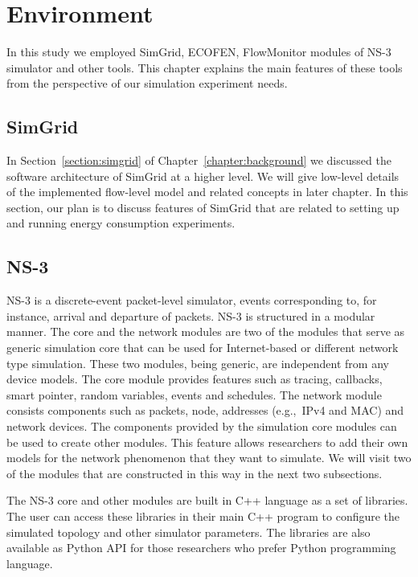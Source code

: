 \chapter{Environment}
\label{chapter:environment}
In this study we employed SimGrid, ECOFEN, FlowMonitor modules of NS-3 simulator and other tools. This chapter explains the main features of these tools from the perspective of our simulation experiment needs.

\section{SimGrid}
In Section~\ref{section:simgrid} of Chapter~\ref{chapter:background} we discussed the software architecture of SimGrid at a higher level. We will give low-level details of the implemented flow-level model and related concepts in later chapter. In this section, our plan is to discuss features of SimGrid that are related to setting up and running energy consumption experiments.

\section{NS-3}
NS-3 is a discrete-event packet-level simulator, events corresponding to, for instance, arrival and departure of packets. NS-3 is structured in a modular manner. The core and the network modules are two of the modules that serve as generic simulation core that can be used for Internet-based or different network type simulation. These two modules, being generic, are independent from any device models. The core module provides features such as tracing, callbacks, smart pointer, random variables, events and schedules. The network module consists components such as packets, node, addresses (e.g.,~IPv4 and MAC) and network devices. The components provided by the simulation core modules can be used to create other modules. This feature allows researchers to add their own models for the network phenomenon that they want to simulate. We will visit two of the modules that are constructed in this way in the next two subsections\cite{ns3}. 

The NS-3 core and other modules are built in C++ language as a set of libraries. The user can access these libraries in their main C++ program to configure the simulated topology and other simulator parameters. The libraries are also available as Python API for those researchers who prefer Python programming language. 

